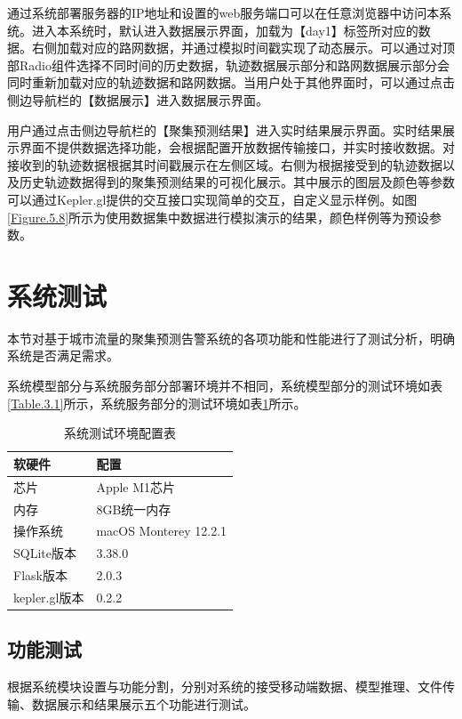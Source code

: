 \documentclass[master]{thesis-uestc}
\begin{document}
通过系统部署服务器的IP地址和设置的web服务端口可以在任意浏览器中访问本系统。进入本系统时，默认进入数据展示界面，加载为【day1】标签所对应的数据。右侧加载对应的路网数据，并通过模拟时间戳实现了动态展示。可以通过对顶部Radio组件选择不同时间的历史数据，轨迹数据展示部分和路网数据展示部分会同时重新加载对应的轨迹数据和路网数据。当用户处于其他界面时，可以通过点击侧边导航栏的【数据展示】进入数据展示界面。

用户通过点击侧边导航栏的【聚集预测结果】进入实时结果展示界面。实时结果展示界面不提供数据选择功能，会根据配置开放数据传输接口，并实时接收数据。对接收到的轨迹数据根据其时间戳展示在左侧区域。右侧为根据接受到的轨迹数据以及历史轨迹数据得到的聚集预测结果的可视化展示。其中展示的图层及颜色等参数可以通过Kepler.gl提供的交互接口实现简单的交互，自定义显示样例。如图\ref{Figure.5.8}所示为使用数据集中数据进行模拟演示的结果，颜色样例等为预设参数。

\section{系统测试}
本节对基于城市流量的聚集预测告警系统的各项功能和性能进行了测试分析，明确系统是否满足需求。

系统模型部分与系统服务部分部署环境并不相同，系统模型部分的测试环境如表\ref{Table.3.1}所示，系统服务部分的测试环境如表\ref{Table.5.2}所示。
\begin{table}[!htb]
\centering
\caption{系统测试环境配置表}%
\label{Table.5.2}
\begin{tabular}{ll}
\toprule[1.5pt]
软硬件& 配置\\
\midrule[0.75pt]
芯片& Apple M1芯片\\
内存& 8GB统一内存\\
操作系统& macOS Monterey 12.2.1\\
SQLite版本& 3.38.0\\
Flask版本& 2.0.3\\
kepler.gl版本& 0.2.2\\
\bottomrule[1.5pt]
\end{tabular}
\end{table}

\subsection{功能测试}
根据系统模块设置与功能分割，分别对系统的接受移动端数据、模型推理、文件传输、数据展示和结果展示五个功能进行测试。
\end{document}
